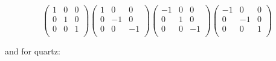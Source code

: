 \documentclass[a4paper,12pt,twoside]{report}
\numberwithin{equation}{chapter}
\begin{document}
\begin{equation}
\begin{pmatrix}
1 & 0 & 0 \\
0 & 1 & 0 \\
0 & 0 & 1 \\
\end{pmatrix}
\begin{pmatrix}
1 & 0 & 0 \\
0 & -1 & 0 \\
0 & 0 & -1 \\
\end{pmatrix}
\begin{pmatrix}
-1 & 0 & 0 \\
0 & 1 & 0 \\
0 & 0 & -1 \\
\end{pmatrix}
\begin{pmatrix}
-1 & 0 & 0 \\
0 & -1 & 0 \\
0 & 0 & 1 \\
\end{pmatrix}
\end{equation}

and for quartz:
\end{document}
